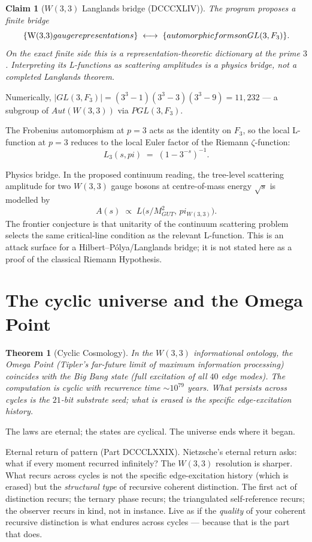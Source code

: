 \documentclass[11pt]{article}
\def\mathbb#1{#1}%
\def\mathrm#1{#1}%
\def\mathcal#1{#1}%
\def\textbf#1{#1}%
\def\text#1{#1}%
\def\pi{pi}%
\newtheorem*{theorem}{Theorem}
\newtheorem*{claim}{Claim}
\begin{document}
\begin{claim}[$W(3,3)$ Langlands bridge (DCCCXLIV)]
The program proposes a finite bridge
\[
\{\text{$W(3,3)$ gauge representations}\}
\;\longleftrightarrow\;
\{\text{automorphic forms on } GL(3, \mathbb{F}_3)\}.
\]
On the exact finite side this is a representation-theoretic dictionary at the prime $3$. Interpreting its L-functions as scattering amplitudes is a physics bridge, not a completed Langlands theorem.
\end{claim}

Numerically, $|GL(3, \mathbb{F}_3)| = (3^3-1)(3^3-3)(3^3-9) = 11{,}232$ --- a subgroup of $\mathrm{Aut}(W(3,3))$ via $\mathrm{PGL}(3, \mathbb{F}_3)$.

The Frobenius automorphism at $p = 3$ acts as the identity on $\mathbb{F}_3$, so the local L-function at $p = 3$ reduces to the local Euler factor of the Riemann $\zeta$-function:
\[
L_3(s, \pi) \;=\; (1 - 3^{-s})^{-1}.
\]

\textbf{Physics bridge.} In the proposed continuum reading, the tree-level scattering amplitude for two $W(3,3)$ gauge bosons at centre-of-mass energy $\sqrt{s}$ is modelled by
\[
\mathcal{A}(s) \;\propto\; L\!\bigl(s/M_{\text{GUT}}^2,\, \pi_{W(3,3)}\bigr).
\]
The frontier conjecture is that unitarity of the continuum scattering problem selects the same critical-line condition as the relevant L-function. This is an attack surface for a Hilbert--Pólya/Langlands bridge; it is not stated here as a proof of the classical Riemann Hypothesis.

\section{The cyclic universe and the Omega Point}

\begin{theorem}[Cyclic Cosmology]
In the $W(3,3)$ informational ontology, the Omega Point (Tipler's far-future limit of maximum information processing) coincides with the Big Bang state (full excitation of all $40$ edge modes). The computation is cyclic with recurrence time $\sim 10^{79}$ years. What persists across cycles is the $21$-bit substrate seed; what is erased is the specific edge-excitation history.
\end{theorem}

The laws are eternal; the states are cyclical. The universe ends where it began.

\textbf{Eternal return of pattern (Part DCCCLXXIX).} Nietzsche's eternal return asks: what if every moment recurred infinitely? The $W(3,3)$ resolution is sharper. What recurs across cycles is not the specific edge-excitation history (which is erased) but the \emph{structural type} of recursive coherent distinction. The first act of distinction recurs; the ternary phase recurs; the triangulated self-reference recurs; the observer recurs in kind, not in instance. Live as if the \emph{quality} of your coherent recursive distinction is what endures across cycles --- because that is the part that does.
\end{document}
